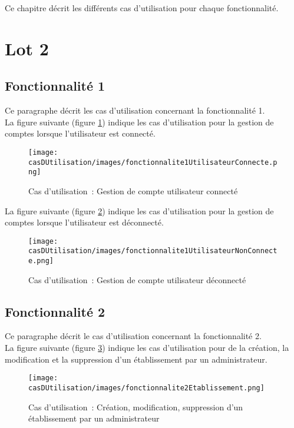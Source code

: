 
Ce chapitre décrit les différents cas d'utilisation pour chaque fonctionnalité.

\section{Lot 2}
\subsection{Fonctionnalité 1}
Ce paragraphe décrit les cas d'utilisation concernant la fonctionnalité 1. \\

La figure suivante (figure \ref{diagrammeCasUtilisation1-1}) indique les cas d'utilisation pour la gestion de comptes lorsque l'utilisateur est connecté.
\begin{figure}[H]
	\centering
	\texttt{[image: casDUtilisation/images/fonctionnalite1UtilisateurConnecte.png]}
	\caption{Cas d'utilisation~: Gestion de compte utilisateur connecté }
	\label{diagrammeCasUtilisation1-1}
\end{figure}

La figure suivante (figure \ref{diagrammeCasUtilisation1-2}) indique les cas d'utilisation pour la gestion de comptes lorsque l'utilisateur est déconnecté.
\begin{figure}[H]
	\centering
	\texttt{[image: casDUtilisation/images/fonctionnalite1UtilisateurNonConnecte.png]}
	\caption{Cas d'utilisation~: Gestion de compte utilisateur déconnecté}
	\label{diagrammeCasUtilisation1-2}
\end{figure}

\subsection{Fonctionnalité 2}
Ce paragraphe décrit le cas d'utilisation concernant la fonctionnalité 2. \\

La figure suivante (figure \ref{diagrammeCasUtilisation2}) indique les cas d'utilisation pour de la création, la modification et la suppression d'un établissement par un administrateur.
\begin{figure}[H]
	\centering
	\texttt{[image: casDUtilisation/images/fonctionnalite2Etablissement.png]}
	\caption{Cas d'utilisation~: Création, modification, suppression d'un établissement par un administrateur}
	\label{diagrammeCasUtilisation2}
\end{figure}

